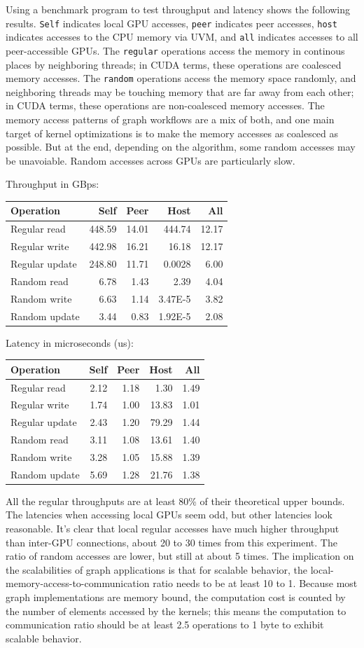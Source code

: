 \documentclass[10pt,oneside]{memoir}
\begin{document}
Using a benchmark program to test throughput and latency shows the
following results. \texttt{Self} indicates local GPU accesses,
\texttt{peer} indicates peer accesses, \texttt{host} indicates accesses
to the CPU memory via UVM, and \texttt{all} indicates accesses to all
peer-accessible GPUs. The \texttt{regular} operations access the memory
in continous places by neighboring threads; in CUDA terms, these
operations are coalesced memory accesses. The \texttt{random} operations
access the memory space randomly, and neighboring threads may be
touching memory that are far away from each other; in CUDA terms, these
operations are non-coalesced memory accesses. The memory access patterns
of graph workflows are a mix of both, and one main target of kernel
optimizations is to make the memory accesses as coalesced as possible.
But at the end, depending on the algorithm, some random accesses may be
unavoiable. Random accesses across GPUs are particularly slow.

Throughput in GBps:

\begin{longtable}[]{@{}lrrrr@{}}
\toprule
Operation & Self & Peer & Host & All\tabularnewline
\midrule
\endhead
Regular read & 448.59 & 14.01 & 444.74 & 12.17\tabularnewline
Regular write & 442.98 & 16.21 & 16.18 & 12.17\tabularnewline
Regular update & 248.80 & 11.71 & 0.0028 & 6.00\tabularnewline
Random read & 6.78 & 1.43 & 2.39 & 4.04\tabularnewline
Random write & 6.63 & 1.14 & 3.47E-5 & 3.82\tabularnewline
Random update & 3.44 & 0.83 & 1.92E-5 & 2.08\tabularnewline
\bottomrule
\end{longtable}

Latency in microseconds (us):

\begin{longtable}[]{@{}lrrrr@{}}
\toprule
Operation & Self & Peer & Host & All\tabularnewline
\midrule
\endhead
Regular read & 2.12 & 1.18 & 1.30 & 1.49\tabularnewline
Regular write & 1.74 & 1.00 & 13.83 & 1.01\tabularnewline
Regular update & 2.43 & 1.20 & 79.29 & 1.44\tabularnewline
Random read & 3.11 & 1.08 & 13.61 & 1.40\tabularnewline
Random write & 3.28 & 1.05 & 15.88 & 1.39\tabularnewline
Random update & 5.69 & 1.28 & 21.76 & 1.38\tabularnewline
\bottomrule
\end{longtable}

All the regular throughputs are at least 80\% of their theoretical upper
bounds. The latencies when accessing local GPUs seem odd, but other
latencies look reasonable. It's clear that local regular accesses have
much higher throughput than inter-GPU connections, about 20 to 30 times
from this experiment. The ratio of random accesses are lower, but still
at about 5 times. The implication on the scalabilities of graph
applications is that for scalable behavior, the
local-memory-access-to-communication ratio needs to be at least 10 to 1.
Because most graph implementations are memory bound, the computation
cost is counted by the number of elements accessed by the kernels; this
means the computation to communication ratio should be at least 2.5
operations to 1 byte to exhibit scalable behavior.
\end{document}
